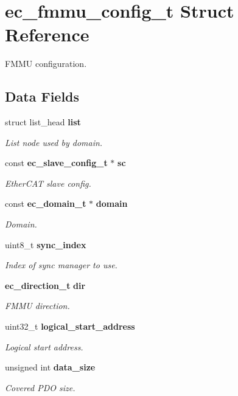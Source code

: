 \section{ec\-\_\-fmmu\-\_\-config\-\_\-t \-Struct \-Reference}
\label{structec__fmmu__config__t}


\-F\-M\-M\-U configuration.  


\subsection*{\-Data \-Fields}
\begin{DoxyCompactItemize}
\item 
struct list\-\_\-head {\bf list}
\begin{DoxyCompactList}\small\item\em \-List node used by domain. \end{DoxyCompactList}\item 
const {\bf ec\-\_\-slave\-\_\-config\-\_\-t} $\ast$ {\bf sc}
\begin{DoxyCompactList}\small\item\em \-Ether\-C\-A\-T slave config. \end{DoxyCompactList}\item 
const {\bf ec\-\_\-domain\-\_\-t} $\ast$ {\bf domain}
\begin{DoxyCompactList}\small\item\em \-Domain. \end{DoxyCompactList}\item 
uint8\-\_\-t {\bf sync\-\_\-index}
\begin{DoxyCompactList}\small\item\em \-Index of sync manager to use. \end{DoxyCompactList}\item 
{\bf ec\-\_\-direction\-\_\-t} {\bf dir}
\begin{DoxyCompactList}\small\item\em \-F\-M\-M\-U direction. \end{DoxyCompactList}\item 
uint32\-\_\-t {\bf logical\-\_\-start\-\_\-address}
\begin{DoxyCompactList}\small\item\em \-Logical start address. \end{DoxyCompactList}\item 
unsigned int {\bf data\-\_\-size}
\begin{DoxyCompactList}\small\item\em \-Covered \-P\-D\-O size. \end{DoxyCompactList}\end{DoxyCompactItemize}


